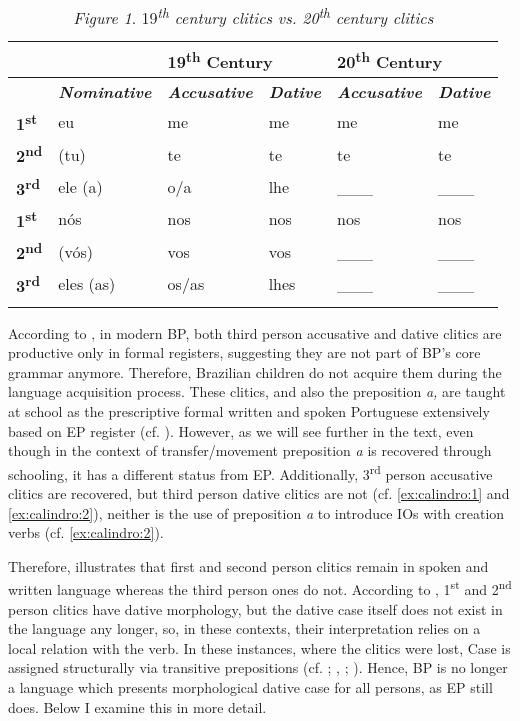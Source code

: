 \documentclass[output=paper,colorlinks,citecolor=brown]{./langscibook}
\begin{document}
\begin{table}
\label{fig:calindro:1}
\caption{\textit{Figure 1}. 19\textit{\textsuperscript{th} century clitics vs. 20\textsuperscript{th} century clitics}}
\begin{tabularx}{\textwidth}{XXXXXX}
\lsptoprule
&  & \multicolumn{2}{X}{{\bfseries 19\textsuperscript{th} Century}} & \multicolumn{2}{X}{{\bfseries 20\textsuperscript{th} Century}}\\
\midrule
& \textbf{\textit{Nominative}} & \textbf{\textit{Accusative}} & \textbf{\textit{Dative}} & \textbf{\textit{Accusative}} & \textbf{\textit{Dative}}\\
{\bfseries 1\textsuperscript{st} } & eu & me & me & me & me\\
{\bfseries 2\textsuperscript{nd}}  & (tu) & te & te & te & te\\
{\bfseries 3\textsuperscript{rd}}  & ele (a) & o/a & lhe & \_\_\_ & \_\_\_\\
{\bfseries 1\textsuperscript{st}}  & nós & nos & nos & nos & nos\\
{\bfseries 2\textsuperscript{nd}} & (vós) & vos & vos & \_\_\_ & \_\_\_\\
{\bfseries 3\textsuperscript{rd}}  & eles (as) & os/as & lhes & \_\_\_ & \_\_\_\\
\lspbottomrule
\end{tabularx}
\end{table}

According to \citet{Kato2005}, in modern BP, both third person accusative and dative clitics are productive only in formal registers, suggesting they are not part of BP’s core grammar anymore. Therefore, Brazilian children do not acquire them during the language acquisition process. These clitics, and also the preposition \textit{a,} are taught at school as the prescriptive formal written and spoken Portuguese extensively based on EP register (cf. \citealt{KatoCyrinoCorrêa2009}). However, as we will see further in the text, even though in the context of transfer/movement preposition \textit{a} is recovered through schooling, it has a different status from EP. Additionally, 3\textsuperscript{rd} person accusative clitics are recovered, but third person dative clitics are not (cf. \ref{ex:calindro:1} and \ref{ex:calindro:2}), neither is the use of preposition \textit{a} to introduce IOs with creation verbs (cf. \ref{ex:calindro:2}).

Therefore,  illustrates that first and second person clitics remain in spoken and written language whereas the third person ones do not. According to \citet{Galves2018}, 1\textsuperscript{st} and 2\textsuperscript{nd} person clitics have dative morphology, but the dative case itself does not exist in the language any longer, so, in these contexts, their interpretation relies on a local relation with the verb. In these instances, where the clitics were lost, Case is assigned structurally via transitive prepositions (cf. \citealt{TorresMoraisSalles2010}; \citealt{Calindro2015}, \citeyear{Calindro2016}; \citealt{CarvalhoCalindro2018}). Hence, BP is no longer a language which presents morphological dative case for all persons, as EP still does. Below I examine this in more detail.
\end{document}
